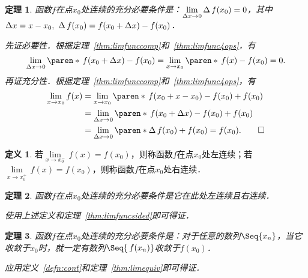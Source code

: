 \documentclass[a4paper,punct=CCT]{ctexbook}
\makeatletter
\newtheorem{theorem}{定理}
\theoremstyle{definition}
\newtheorem*{definition*}{定义}
\theoremstyle{remark}
\renewcommand*{\proofname}{证}
\renewenvironment{proof}[1][\proofname]{\par
  \pushQED{\qed}%
  \normalfont \topsep6\p@\@plus6\p@\relax
  \trivlist
  \item[\hskip\labelsep
    \bfseries
    #1%
    ]\ignorespaces
}{%
  \popQED\endtrivlist\@endpefalse
}
\makeatother
\begin{document}
\begin{theorem}
  \label{thm:contequivdefn}
  函数\(f\)在点\(x_0\)处连续的充分必要条件是：\(\lim\limits_{\mathop{}\!\Delta x \to 0} \mathop{}\!\Delta\,f(x_0) = 0\)，其中\(\fwdf x = x - x_0,\ \fwdf\,f(x_0) = f(x_0+\fwdf x) - f(x_0)\)．

  \begin{proof}
    先证必要性．根据定理~\ref{thm:limfunccomp}和~\ref{thm:limfunc4ops}，有
    \begin{equation*}
      \lim_{\fwdf x \to 0} \paren*{\,f(x_0 + \fwdf x) - f(x_0)}
      = \lim_{x\to x_0} \paren*{\,f(x) - f(x_0)}
      = 0.
    \end{equation*}
    再证充分性．根据定理~\ref{thm:limfunccomp}和~\ref{thm:limfunc4ops}，有
    \begin{equation*}
      \begin{split}
        \lim_{x\to x_0} f(x)
        &= \lim_{x\to x_0} \paren*{\,f(x_0 + x - x_0) - f(x_0) + f(x_0)} \\
        &= \lim_{\fwdf x \to 0} \paren*{\,f(x_0 + \fwdf x) - f(x_0) + f(x_0)} \\
        &= \lim_{\fwdf x \to 0} \paren*{\fwdf\,f(x_0) + f(x_0)} = f(x_0).
        \qedhere
      \end{split}
    \end{equation*}
  \end{proof}
\end{theorem}

\begin{definition*}
  若\(\lim\limits_{x\to x_0^-}\,f(x) = f(x_0)\)，则称函数\(f\)在点\(x_0\)处左连续；若\(\lim\limits_{x\to x_0^+} \,f(x) = f(x_0)\)，则称函数\(f\)在点\(x_0\)处右连续．
\end{definition*}

\begin{theorem}
  \label{thm:contsided}
  函数\(f\)在点\(x_0\)处连续的充分必要条件是它在此处左连续且右连续．

  \begin{proof}
    使用上述定义和定理~\ref{thm:limfuncsided}即可得证．
  \end{proof}
\end{theorem}

\begin{theorem}
  \label{thm:contequiv}
  函数\(f\)在点\( x_0\)处连续的充分必要条件是：对于任意的数列\(\Seq{x_n}\)，当它收敛于\(x_0\)时，就一定有数列\(\Seq{\,f(x_n)}\)收敛于\(f(x_0)\)．

  \begin{proof}
    应用定义~\ref{defn:cont}和定理~\ref{thm:limequiv}即可得证．
  \end{proof}
\end{theorem}
\end{document}
